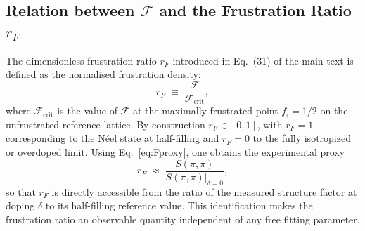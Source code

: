   \subsection{Relation between $\mathcal{F}$ and the Frustration Ratio $r_F$}
    \label{subsec:relation-between-F-and-the-frustration-ratio-r_f}

    The dimensionless frustration ratio $r_F$ introduced in Eq.~(31) of the main text is defined as
    the normalised frustration density:
    \begin{equation}
      r_F \;\equiv\; \frac{\mathcal{F}}{\mathcal{F}_\textrm{crit}},
      \label{eq:rF_def}
    \end{equation}
    where $\mathcal{F}_\textrm{crit}$ is the value of $\mathcal{F}$ at the maximally frustrated point
    $f_\square = 1/2$ on the unfrustrated reference lattice.
    By construction $r_F \in [0,1]$, with $r_F = 1$ corresponding to the N\'{e}el state at
    half-filling and $r_F = 0$ to the fully isotropized or overdoped limit.
    Using Eq.~\eqref{eq:Fproxy}, one obtains the experimental proxy
    \begin{equation}
      r_F \;\approx\; \frac{S(\pi,\pi)}{S(\pi,\pi)\big|_{\delta=0}},
      \label{eq:rF_proxy}
    \end{equation}
    so that $r_F$ is directly accessible from the ratio of the measured structure factor at doping
    $\delta$ to its half-filling reference value.
    This identification makes the frustration ratio an observable quantity independent of any
    free fitting parameter.
